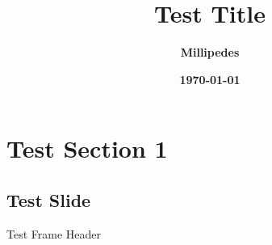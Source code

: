\documentclass{beamer}
\title{Test Title}
\author{\textbf{Millipedes}}
\institute{\textbf{Study Tester}}
\date{\textbf{\today}}
\begin{document}
\begin{frame}
    \titlepage
\end{frame}

\section{Test Section 1}
    \subsection{Test Slide}
        \begin{frame}{Test Frame Header}
        \end{frame}
\end{document}
